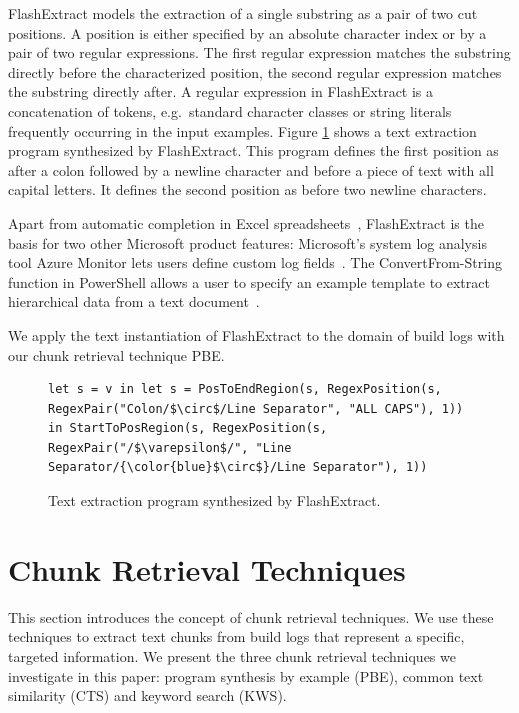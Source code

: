 FlashExtract models the extraction of a single substring as a pair of two cut positions.
A position is either specified by an absolute character index or by a pair of two regular expressions.
The first regular expression matches the substring directly before the characterized position, the second regular expression matches the substring directly after.
A regular expression in FlashExtract is a concatenation of tokens, e.g.\ standard character classes or string literals frequently occurring in the input examples.
Figure \ref{lst:prose-program} shows a text extraction program synthesized by FlashExtract.
This program defines the first position as after a colon followed by a newline character and before a piece of text with all capital letters.
It defines the second position as before two newline characters.

Apart from automatic completion in Excel spreadsheets~\cite{excel2019flashfill}, FlashExtract is the basis for two other Microsoft product features:
Microsoft's system log analysis tool Azure Monitor lets users define custom log fields~\cite{azure2019custom}.
The ConvertFrom-String function in PowerShell allows a user to specify an example template to extract hierarchical data from a text document~\cite{powershell2019convert}.

We apply the text instantiation of FlashExtract to the domain of build logs with our chunk retrieval technique PBE\@.

\begin{figure}[!t]
  \centering
  \begin{lstlisting}[breaklines=true]
let s = v in let s = PosToEndRegion(s, RegexPosition(s, RegexPair("Colon/$\circ$/Line Separator", "ALL CAPS"), 1)) in StartToPosRegion(s, RegexPosition(s, RegexPair("/$\varepsilon$/", "Line Separator/{\color{blue}$\circ$}/Line Separator"), 1))
  \end{lstlisting}  
  \caption{Text extraction program synthesized by FlashExtract.}
  \label{lst:prose-program}
\end{figure}

\section{Chunk Retrieval Techniques}
\label{sec:techniques}
This section introduces the concept of chunk retrieval techniques.
We use these techniques to extract text chunks from build logs that represent a specific, targeted information.
We present the three chunk retrieval techniques we investigate in this paper:
program synthesis by example (PBE), common text similarity (CTS) and keyword search (KWS).

